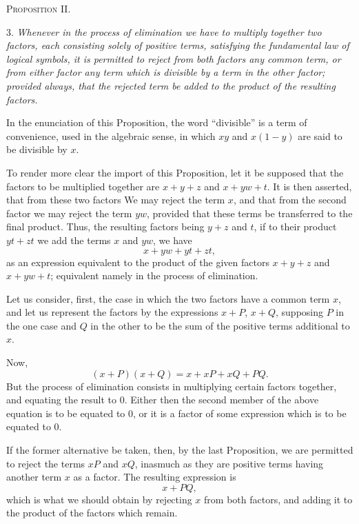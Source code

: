 \documentclass[oneside]{book}
\begin{document}
\begin{center}
\textsc{Proposition II.}
\end{center}

3. \textit{Whenever in the process of elimination we have to multiply
together two factors, each consisting solely of positive terms, satisfying
the fundamental law of logical symbols, it is permitted to reject from
both factors any common term, or from either factor any term which
is divisible by a term in the other factor; provided always, that the
rejected term be added to the product of the resulting factors.}

In the enunciation of this Proposition, the word ``divisible''
is a term of convenience, used in the algebraic sense, in which $xy$
and $x \left(1 - y\right)$ are said to be divisible by $x$.

To render more clear the import of this Proposition, let it be
supposed that the factors to be multiplied together are $x + y + z$
and $x + yw + t$. It is then asserted, that from these two factors
We may reject the term $x$, and that from the second factor we
may reject the term $yw$, provided that these terms be transferred
to the final product. Thus, the resulting factors being $y+z$
and $t$, if to their product $yt+zt$ we add the terms $x$ and $yw$,
we have
\[
x+yw+yt+zt,
\]
as an expression equivalent to the product of the given factors
$x+y+z$ and $x+yw+t$; equivalent namely in the process of
elimination.

Let us consider, first, the case in which the two factors have
a common term $x$, and let us represent the factors by the expressions
$x+P$, $x+Q$, supposing $P$ in the one case and $Q$ in the
other to be the sum of the positive terms additional to $x$.

Now,
\begin{equation}
(x+P)(x+Q) = x+xP+xQ+PQ.
\end{equation}
But the process of elimination consists in multiplying certain
factors together, and equating the result to $0$. Either then the
second member of the above equation is to be equated to $0$, or it
is a factor of some expression which is to be equated to $0$.

If the former alternative be taken, then, by the last Proposition,
we are permitted to reject the terms $xP$ and $xQ$, inasmuch
as they are positive terms having another term $x$ as a factor.
The resulting expression is
\[
x+PQ,
\]
which is what we should obtain by rejecting $x$ from both factors,
and adding it to the product of the factors which remain.
\end{document}
